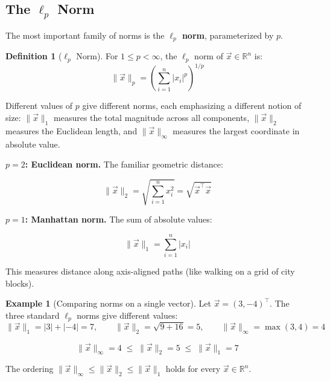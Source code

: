 \documentclass[10pt, twocolumn]{article}
\theoremstyle{definition}
\newtheorem{definition}{Definition}
\newtheorem{example}{Example}
\theoremstyle{plain}
\newcommand{\RR}{\mathbb{R}}
\begin{document}
\subsection{The $\ell_p$ Norm}

The most important family of norms is the \textbf{$\ell_p$ norm}, parameterized by $p$.

\begin{tcolorbox}
\begin{definition}[$\ell_p$ Norm]
For $1 \le p < \infty$, the $\ell_p$ norm of $\vec{x} \in \RR^n$ is:
\[
    \|\vec{x}\|_p = \left(\sum_{i=1}^{n} |x_i|^p\right)^{1/p}
\]
\end{definition}
\end{tcolorbox}

Different values of $p$ give different norms, each emphasizing a different notion of size: $\|\vec{x}\|_1$ measures the total magnitude across all components, $\|\vec{x}\|_2$ measures the Euclidean length, and $\|\vec{x}\|_\infty$ measures the largest coordinate in absolute value.

\textbf{$p = 2$: Euclidean norm.} The familiar geometric distance:
\begin{result}
\[
    \|\vec{x}\|_2 = \sqrt{\sum_{i=1}^{n} x_i^2} = \sqrt{\vec{x}^\top \vec{x}}
\]
\end{result}

\textbf{$p = 1$: Manhattan norm.} The sum of absolute values:
\begin{result}
\[
    \|\vec{x}\|_1 = \sum_{i=1}^{n} |x_i|
\]
\end{result}

This measures distance along axis-aligned paths (like walking on a grid of city blocks).

\begin{example}[Comparing norms on a single vector]
Let $\vec{x} = (3, -4)^\top$. The three standard $\ell_p$ norms give different values:
\[
    \|\vec{x}\|_1 = |3| + |-4| = 7, \qquad
    \|\vec{x}\|_2 = \sqrt{9 + 16} = 5, \qquad
    \|\vec{x}\|_\infty = \max(3, 4) = 4
\]
\begin{result}
\[
    \|\vec{x}\|_\infty = 4 \;\le\; \|\vec{x}\|_2 = 5 \;\le\; \|\vec{x}\|_1 = 7
\]
\end{result}
The ordering $\|\vec{x}\|_\infty \le \|\vec{x}\|_2 \le \|\vec{x}\|_1$ holds for every $\vec{x} \in \RR^n$.
\end{example}
\end{document}
